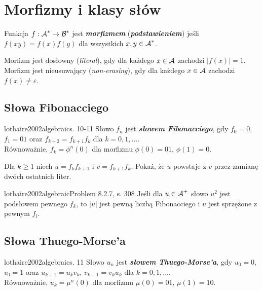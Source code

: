 \section{Morfizmy i klasy słów}

\begin{definition}{}{}
  Funkcja $f: \operatorname{\mathcal{A}}^* \to \operatorname{\mathcal{B}}^*$ jest \textbf{\textit{morfizmem}} (\textbf{\textit{podstawieniem}}) jeśli $f(xy) = f(x)f(y)$ dla wszystkich $x, y \in \operatorname{\mathcal{A}}^*$.
\end{definition}
Morfizm jest dosłowny (\emph{literal}), gdy dla każdego $x \in \operatorname{\mathcal{A}}$ zachodzi $|f(x)| = 1$. \\
Morfizm jest nieusuwający (\emph{non-erasing}), gdy dla każdego $x \in \operatorname{\mathcal{A}}$ zachodzi $f(x) \neq \varepsilon$.

\subsection{Słowa Fibonacciego}

\begin{definition}{lothaire2002algebraic}{s. 10-11}
  Słowo $f_n$ jest \textbf{\textit{słowem Fibonacciego}}, gdy $f_0 = 0$, $f_1 = 01$ oraz $f_{k + 2} = f_{k + 1} f_k$ dla $k = 0, 1, \ldots$.
  \\
  Równoważnie, $f_k = \phi^n(0)$ dla morfizmu $\phi(0) = 01$, $\phi(1) = 0$.
\end{definition}

\begin{problem}{}{}
  Dla $k \ge 1$ niech $u = f_k f_{k + 1}$ i $v = f_{k + 1} f_k$. Pokaż, że $u$ powstaje z $v$ przez zamianę dwóch ostatnich liter.
\end{problem}

\begin{problem}{lothaire2002algebraic}{Problem 8.2.7, s. 308}
  Jeśli dla $u \in \operatorname{\mathcal{A}}^+$ słowo $u^2$ jest podsłowem pewnego $f_k$, to $|u|$ jest pewną liczbą Fibonacciego i $u$ jest sprzężone z pewnym $f_l$.
\end{problem}

\subsection{Słowa Thuego-Morse'a}

\begin{definition}{lothaire2002algebraic}{s. 11}
  Słowo $u_n$ jest \textbf{\textit{słowem Thuego-Morse'a}}, gdy $u_0 = 0$, $v_0 = 1$ oraz $u_{k + 1} = u_k v_k$, $v_{k + 1} = v_k u_k$ dla $k = 0, 1, \ldots$.
  \\
  Równoważnie, $u_k = \mu^n(0)$ dla morfizmu $\mu(0) = 01$, $\mu(1) = 10$.
\end{definition}

